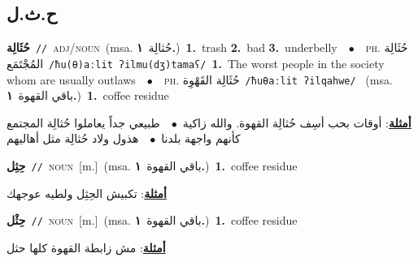 \documentclass[10pt,a4paper,twoside]{article} %
\begin{document}
\begin{multicols}{2}
\vspace{-3mm}
\subsection*{\color{blue}\foreignlanguage{arabic}{ح.ث.ل}\color{blue}{}} 

{\setlength\topsep{0pt}\textbf{\foreignlanguage{arabic}{حُثَالِة}}\ {\color{gray}\texttt{//}\color{black}}\ \textsc{adj/noun}\ \color{gray}(msa. \foreignlanguage{arabic}{حُثالِة}~\foreignlanguage{arabic}{\textbf{١.}})\color{black}\ \textbf{1.}~trash  \textbf{2.}~bad  \textbf{3.}~underbelly\ \ $\bullet$\ \ \textsc{ph.} \color{gray} \foreignlanguage{arabic}{حُثَالِة المُجْتَمَع}\color{black}\ {\color{gray}\texttt{/{\sffamily ħu(θ)aːlit ʔilmu(dʒ)tamaʕ}/}\color{black}}\ \textbf{1.}~The worst people in the society whom are usually outlaws\ \ $\bullet$\ \ \textsc{ph.} \color{gray} \foreignlanguage{arabic}{حُثَالِة القَهْوِة}\color{black}\ {\color{gray}\texttt{/{\sffamily ħuθaːlit ʔilqahwe}/}\color{black}}\ \color{gray} (msa. \foreignlanguage{arabic}{باقي القهوة}~\foreignlanguage{arabic}{\textbf{١.}})\color{black}\ \textbf{1.}~coffee residue\  \begin{flushright}\color{gray}\foreignlanguage{arabic}{\textbf{\underline{\foreignlanguage{arabic}{أمثلة}}}: أوقات بحب أسِف حُثالِة القهوة. والله زاكية\ $\bullet$\ \  طبيعي جداً يعاملوا حُثالِة المجتمع كأنهم واجهة بلدنا\ $\bullet$\ \  هذول ولاد حُثالِة مثل أهاليهم}\end{flushright}\color{black}} \vspace{2mm}

{\setlength\topsep{0pt}\textbf{\foreignlanguage{arabic}{حِثِل}}\ {\color{gray}\texttt{//}\color{black}}\ \textsc{noun}\ [m.]\ \color{gray}(msa. \foreignlanguage{arabic}{باقي القهوة}~\foreignlanguage{arabic}{\textbf{١.}})\color{black}\ \textbf{1.}~coffee residue\  \begin{flushright}\color{gray}\foreignlanguage{arabic}{\textbf{\underline{\foreignlanguage{arabic}{أمثلة}}}: تكبيش الحِثِل ولطيه عوجهك}\end{flushright}\color{black}} \vspace{2mm}

{\setlength\topsep{0pt}\textbf{\foreignlanguage{arabic}{حِثْل}}\ {\color{gray}\texttt{//}\color{black}}\ \textsc{noun}\ [m.]\ \color{gray}(msa. \foreignlanguage{arabic}{باقي القهوة}~\foreignlanguage{arabic}{\textbf{١.}})\color{black}\ \textbf{1.}~coffee residue\  \begin{flushright}\color{gray}\foreignlanguage{arabic}{\textbf{\underline{\foreignlanguage{arabic}{أمثلة}}}: مش زابطة القهوة كلها حثل}\end{flushright}\color{black}} \vspace{2mm}


\end{multicols}
\end{document}
